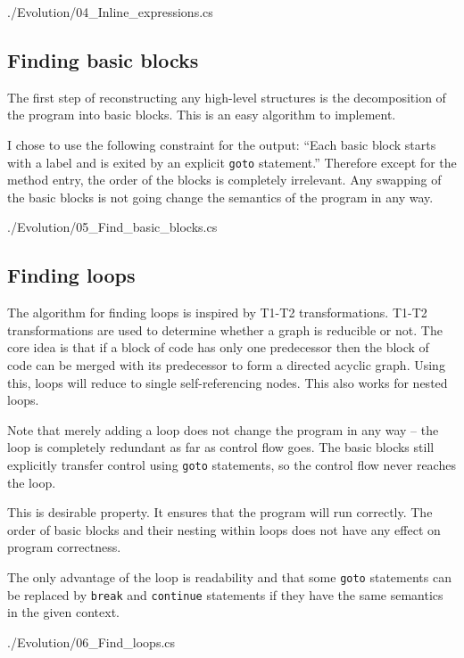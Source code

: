 \documentclass[12pt]{article}
\begin{document}

{./Evolution/04_Inline_expressions.cs}

\newpage
\subsection*{Finding basic blocks}

The first step of reconstructing any high-level structures is the 
decomposition of the program into basic blocks.  This is an easy
algorithm to implement.

I chose to use the following constraint for the output:
``Each basic block starts with a label and is exited by an explicit 
\verb|goto| statement.''
Therefore except for the method entry, the order 
of the blocks is completely irrelevant.  Any swapping of the basic
blocks is not going change the semantics of the program in any way.


{./Evolution/05_Find_basic_blocks.cs}

\newpage
\subsection*{Finding loops}

The algorithm for finding loops is inspired by T1-T2 transformations.
T1-T2 transformations are used to determine whether a graph is 
reducible or not.  The core idea is that if a block of code has 
only one predecessor then the block of code can be merged
with its predecessor to form a directed acyclic graph.  Using this,
loops will reduce to single self-referencing nodes.  
This also works for nested loops.

Note that merely adding a loop does not change the program in any way --
the loop is completely redundant as far as control flow goes.  
The basic blocks still explicitly transfer control using \verb|goto|
statements, so the control flow never reaches the loop.

This is desirable property.  It ensures that the program will run
correctly.  The order of basic blocks and their nesting within loops
does not have any effect on program correctness.

The only advantage of the loop is readability and that some \verb|goto|
statements can be replaced by \verb|break| and \verb|continue| statements
if they have the same semantics in the given context.


{./Evolution/06_Find_loops.cs}
\end{document}
